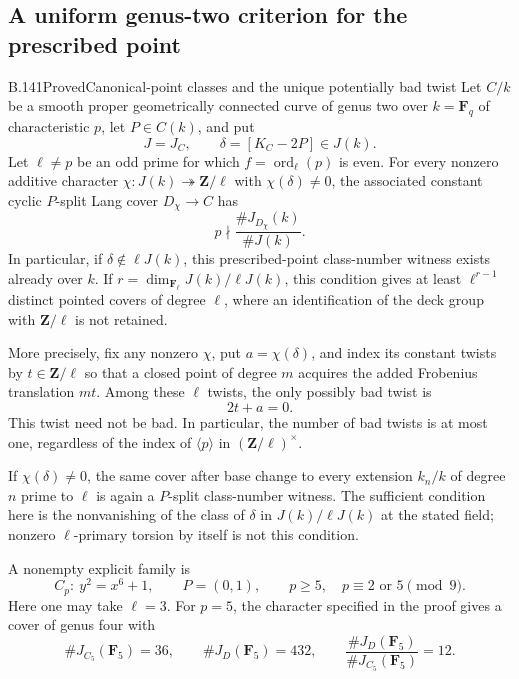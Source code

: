 \subsection{A uniform genus-two criterion for the prescribed point}

\begin{claim}{B.141}{Proved}{Canonical-point classes and the unique potentially bad twist}
Let $C/k$ be a smooth proper geometrically connected curve of genus
two over $k=\mathbf F_q$ of characteristic $p$, let $P\in C(k)$, and put
\[
 J=J_C,\qquad \delta=[K_C-2P]\in J(k).
\]
Let $\ell\ne p$ be an odd prime for which
$f=\operatorname{ord}_{\ell}(p)$ is even.
For every nonzero additive character
$\chi:J(k)\twoheadrightarrow\mathbf Z/\ell$ with
$\chi(\delta)\ne0$, the associated constant cyclic
$P$-split Lang cover $D_\chi\to C$ has
\[
                  p\nmid \frac{\#J_{D_\chi}(k)}{\#J(k)}.
                                                            \tag{B.141.1}
\]
In particular, if $\delta\notin\ell J(k)$, this prescribed-point
class-number witness exists already over $k$.
If $r=\dim_{\mathbf F_\ell}J(k)/\ell J(k)$, this condition gives
at least $\ell^{r-1}$ distinct pointed covers of degree $\ell$,
where an identification of the deck group with
$\mathbf Z/\ell$ is not retained.

More precisely, fix any nonzero $\chi$, put $a=\chi(\delta)$,
and index its constant twists by $t\in\mathbf Z/\ell$ so that
a closed point of degree $m$ acquires the added Frobenius
translation $mt$.  Among these $\ell$ twists, the only
possibly bad twist is
\[
                              2t+a=0.                       \tag{B.141.2}
\]
This twist need not be bad.  In particular, the number of bad
twists is at most one, regardless of the index of
$\langle p\rangle$ in $(\mathbf Z/\ell)^\times$.

If $\chi(\delta)\ne0$, the same cover after base change to
every extension $k_n/k$ of degree $n$ prime to $\ell$ is
again a $P$-split class-number witness.
The sufficient condition here is the nonvanishing of the class
of $\delta$ in $J(k)/\ell J(k)$ at the stated field; nonzero
$\ell$-primary torsion by itself is not this condition.

A nonempty explicit family is
\[
 C_p:\ y^2=x^6+1,\qquad P=(0,1),\qquad
          p\ge5,\quad p\equiv2\text{ or }5\pmod9 .
                                                            \tag{B.141.10}
\]
Here one may take $\ell=3$.
For $p=5$, the character specified in the proof gives a cover
of genus four with
\[
  \#J_{C_5}(\mathbf F_5)=36,\qquad
  \#J_D(\mathbf F_5)=432,\qquad
  \frac{\#J_D(\mathbf F_5)}{\#J_{C_5}(\mathbf F_5)}=12.
                                                            \tag{B.141.11}
\]
\end{claim}
